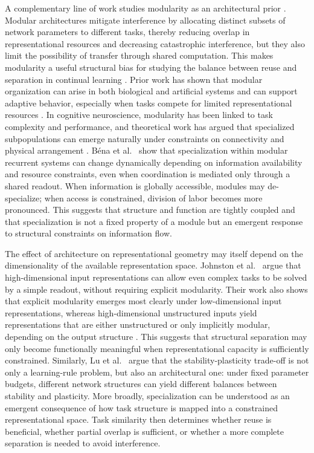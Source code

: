 \documentclass[letterpaper]{article}
\begin{document}
A complementary line of work studies modularity as an architectural prior \cite{ellefsen2015neural, mathis2025leveraging, achterberg2023spatially}. Modular architectures mitigate interference by allocating distinct subsets of network parameters to different tasks, thereby reducing overlap in representational resources and decreasing catastrophic interference, but they also limit the possibility of transfer through shared computation. This makes modularity a useful structural bias for studying the balance between reuse and separation in continual learning \cite{salatiello2026modularitybedrocknaturalartificial}. Prior work has shown that modular organization can arise in both biological and artificial systems and can support adaptive behavior, especially when tasks compete for limited representational resources \cite{clune2013evolutionary,yue2017brain,ellefsen2015neural}. In cognitive neuroscience, modularity has been linked to task complexity and performance, and theoretical work has argued that specialized subpopulations can emerge naturally under constraints on connectivity and physical arrangement \cite{yue2017brain, gu2024emergence}. Béna et al.~\cite{bena2025dynamics} show that specialization within modular recurrent systems can change dynamically depending on information availability and resource constraints, even when coordination is mediated only through a shared readout. When information is globally accessible, modules may de-specialize; when access is constrained, division of labor becomes more pronounced. This suggests that structure and function are tightly coupled and that specialization is not a fixed property of a module but an emergent response to structural constraints on information flow.

The effect of architecture on representational geometry may itself depend on the dimensionality of the available representation space. Johnston et al.~\cite{Johnston2024.09.30.615925} argue that high-dimensional input representations can allow even complex tasks to be solved by a simple readout, without requiring explicit modularity. Their work also shows that explicit modularity emerges most clearly under low-dimensional input representations, whereas high-dimensional unstructured inputs yield representations that are either unstructured or only implicitly modular, depending on the output structure \cite{Johnston2024.09.30.615925}. This suggests that structural separation may only become functionally meaningful when representational capacity is sufficiently constrained. Similarly, Lu et al.~\cite{lu2025rethinking} argue that the stability-plasticity trade-off is not only a learning-rule problem, but also an architectural one: under fixed parameter budgets, different network structures can yield different balances between stability and plasticity. More broadly, specialization can be understood as an emergent consequence of how task structure is mapped into a constrained representational space. Task similarity then determines whether reuse is beneficial, whether partial overlap is sufficient, or whether a more complete separation is needed to avoid interference.
\end{document}
